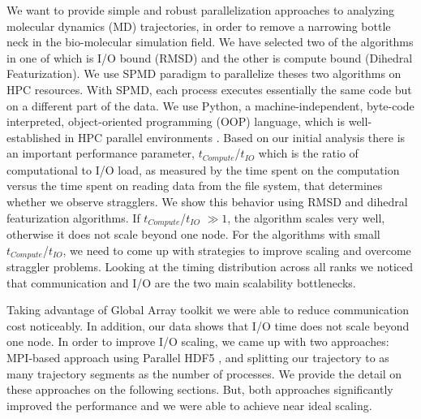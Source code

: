 We want to provide simple and robust parallelization approaches to analyzing molecular dynamics (MD) trajectories, in order to remove a narrowing bottle neck in the bio-molecular simulation field. 
We have selected two of the algorithms in  one of which is I/O bound (RMSD) and the other is compute bound (Dihedral Featurization).
We use SPMD paradigm to parallelize theses two algorithms on HPC resources.
With SPMD, each process executes essentially the same code but on a different part of the data. 
We use Python, a machine-independent, byte-code interpreted, object-oriented programming (OOP) language, which is well-established in HPC parallel environments \cite{GAiN}. 
Based on our initial analysis there is an important performance parameter,  $t_{Compute}$/$t_{IO}$ which is the ratio of computational to I/O load, as measured by the time spent on the computation versus the time spent on reading data from the file system, that determines whether we observe stragglers.
We show this behavior using RMSD and dihedral featurization algorithms.
If $t_{Compute}$/$t_{IO}$  $\gg 1$, the algorithm scales very well, otherwise it does not scale beyond one node. 
For the algorithms with small $t_{Compute}$/$t_{IO}$, we need to come up with strategies to improve scaling and overcome straggler problems.
Looking at the timing distribution across all ranks we noticed that communication and I/O are the two main scalability bottlenecks.

Taking advantage of Global Array toolkit we were able to reduce communication cost noticeably.
In addition, our data shows that I/O time does not scale beyond one node. 
In order to improve I/O scaling, we came up with two approaches: MPI-based approach using Parallel HDF5 \cite{pythonhdf5}, and splitting our trajectory to as many trajectory segments as the number of processes. 
We provide the detail on these approaches on the following sections.
But, both approaches significantly improved the performance and we were able to achieve near ideal scaling.